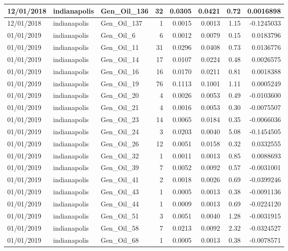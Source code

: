 \documentclass[
  letterpaper,
  DIV=11,
  numbers=noendperiod]{scrartcl}
\begin{document}
\begin{tabular}{l|l|l|r|r|r|r|r}
\hline
12/01/2018 & indianapolis & Gen\_Oil\_136 & 32 & 0.0305 & 0.0421 & 0.72 & 0.0016898\\
\hline
12/01/2018 & indianapolis & Gen\_Oil\_137 & 1 & 0.0015 & 0.0013 & 1.15 & -0.1245033\\
\hline
01/01/2019 & indianapolis & Gen\_Oil\_6 & 6 & 0.0012 & 0.0079 & 0.15 & 0.0183796\\
\hline
01/01/2019 & indianapolis & Gen\_Oil\_11 & 31 & 0.0296 & 0.0408 & 0.73 & 0.0136776\\
\hline
01/01/2019 & indianapolis & Gen\_Oil\_14 & 17 & 0.0107 & 0.0224 & 0.48 & 0.0026575\\
\hline
01/01/2019 & indianapolis & Gen\_Oil\_16 & 16 & 0.0170 & 0.0211 & 0.81 & 0.0018388\\
\hline
01/01/2019 & indianapolis & Gen\_Oil\_19 & 76 & 0.1113 & 0.1001 & 1.11 & 0.0005249\\
\hline
01/01/2019 & indianapolis & Gen\_Oil\_20 & 4 & 0.0026 & 0.0053 & 0.49 & -0.0103600\\
\hline
01/01/2019 & indianapolis & Gen\_Oil\_21 & 4 & 0.0016 & 0.0053 & 0.30 & -0.0075507\\
\hline
01/01/2019 & indianapolis & Gen\_Oil\_23 & 14 & 0.0065 & 0.0184 & 0.35 & -0.0066036\\
\hline
01/01/2019 & indianapolis & Gen\_Oil\_24 & 3 & 0.0203 & 0.0040 & 5.08 & -0.1454505\\
\hline
01/01/2019 & indianapolis & Gen\_Oil\_26 & 12 & 0.0051 & 0.0158 & 0.32 & 0.0332555\\
\hline
01/01/2019 & indianapolis & Gen\_Oil\_32 & 1 & 0.0011 & 0.0013 & 0.85 & 0.0088693\\
\hline
01/01/2019 & indianapolis & Gen\_Oil\_39 & 7 & 0.0052 & 0.0092 & 0.57 & -0.0031001\\
\hline
01/01/2019 & indianapolis & Gen\_Oil\_41 & 2 & 0.0018 & 0.0026 & 0.69 & -0.0399246\\
\hline
01/01/2019 & indianapolis & Gen\_Oil\_43 & 1 & 0.0005 & 0.0013 & 0.38 & -0.0091136\\
\hline
01/01/2019 & indianapolis & Gen\_Oil\_44 & 1 & 0.0009 & 0.0013 & 0.69 & -0.0224120\\
\hline
01/01/2019 & indianapolis & Gen\_Oil\_51 & 3 & 0.0051 & 0.0040 & 1.28 & -0.0031915\\
\hline
01/01/2019 & indianapolis & Gen\_Oil\_58 & 7 & 0.0213 & 0.0092 & 2.32 & -0.0324527\\
\hline
01/01/2019 & indianapolis & Gen\_Oil\_68 & 1 & 0.0005 & 0.0013 & 0.38 & -0.0078571\\

\end{tabular}
\end{document}
